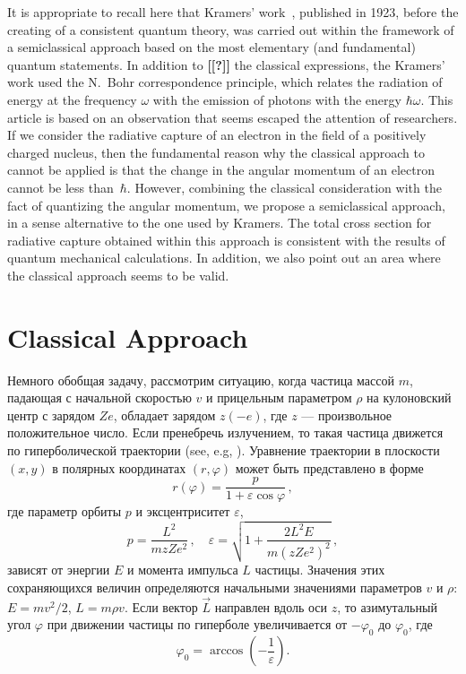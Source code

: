 \documentclass{SovJurn/JETPL}
\begin{document}
It is appropriate to recall here that Kramers' work~\cite{kramers1923xciii}, published in 1923, before the creating of a consistent quantum theory, was carried out within the framework of a semiclassical approach based on the most elementary (and fundamental) quantum statements. In addition to \textbf{[[?]]} the classical expressions, the Kramers' work used the N.~Bohr correspondence principle, which relates the radiation of energy at the frequency $\omega$ with the emission of photons with the energy $\hbar\omega$. This article is based on an observation that seems escaped the attention of researchers. If we consider the radiative capture of an electron in the field of a positively charged nucleus, then the fundamental reason why the classical \cite{elutin} approach to  cannot be applied is that the change in the angular momentum of an electron cannot be less than~$\hbar$. However, combining the classical consideration with the fact of quantizing the angular momentum, we propose a semiclassical approach, in a sense alternative to the one used by Kramers. The total cross section for radiative capture obtained within this approach is consistent with the results of quantum mechanical calculations. In addition, we also point out an area where the classical approach seems to be valid.

\section{Classical Approach}

Немного обобщая задачу, рассмотрим ситуацию, когда частица массой $m$, падающая с начальной скоростью $v$ и прицельным параметром $\rho$ на кулоновский центр с зарядом $Ze$, обладает зарядом $z(-e)$, где $z$ --- произвольное положительное число. Если пренебречь излучением, то такая частица движется по гиперболической траектории (see, e.g, \cite{landau1988theoretical}). Уравнение траектории в плоскости $(x,y)$ в полярных координатах $(r,\varphi)$ может быть представлено в форме
\begin{equation}
r(\varphi)=\frac{p}{1+\varepsilon\cos{\varphi}}\,,
\label{r_phi}
\end{equation}
где параметр орбиты $p$ и эксцентриситет $\varepsilon$,
\begin{equation}
p=\frac{L^2}{mzZe^2}\,,\quad 
\varepsilon=\sqrt{1+\frac{2L^2E}{m(zZe^2)^2}}\,,
\label{parameters}
\end{equation}
зависят от энергии $E$ и момента импульса $L$ частицы. Значения этих сохраняющихся величин определяются начальными значениями параметров $v$ и $\rho$: $E=mv^2/2$, $L=m\rho v$. Если вектор $\vec L$ направлен вдоль оси $z$, то азимутальный угол $\varphi$ при движении частицы по гиперболе увеличивается от $-\varphi_0$ до $\varphi_0$, где
\begin{equation}
\varphi_0=\arccos\left(-\frac{1}{\varepsilon}\right).
\label{angle}
\end{equation}
\end{document}
